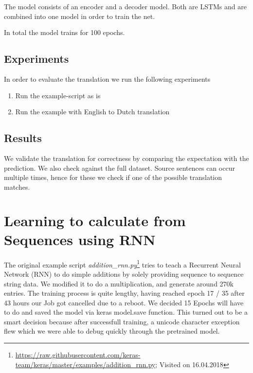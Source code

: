 \documentclass{article}[]
\begin{document}
The model consists of an encoder and a decoder model.
Both are LSTMs and are combined into one model in order to train the net.

In total the model trains for 100 epochs.

\subsection{Experiments}
In order to evaluate the translation we run the following experiments

\begin{enumerate}
	\item{Run the example-script as is}
	\item{Run the example with English to Dutch translation}
\end{enumerate}

\subsection{Results}
We validate the translation for correctness by comparing the expectation with the prediction.
We also check against the full dataset.
Source sentences can occur multiple times, hence for these we check if one of the possible translation matches.







\section{Learning to calculate from Sequences using RNN}
\label{sec:rnn}

The original example script \textit{addition\_rnn.py}\footnote{\url{https://raw.githubusercontent.com/keras-team/keras/master/examples/addition_rnn.py}; Visited on 16.04.2018} tries to teach a Recurrent Neural Network (RNN) to do simple additions by solely providing sequence to sequence string data.
We modified it to do a multiplication, and generate around 270k entries. The training process is quite lengthy, having reached epoch 17 / 35 after 43 hours our Job got cancelled due to a reboot.
We decided 15 Epochs will have to do and saved the model via keras model.save function. This turned out to be a smart decision because after successfull training, a unicode character exception flew which we were able to debug quickly through the pretrained model.
\end{document}

